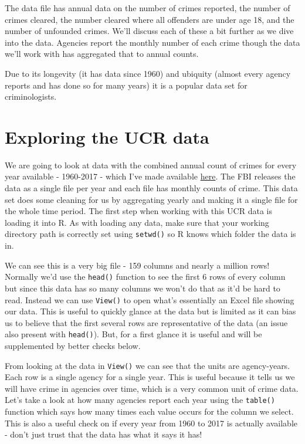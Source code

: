 \documentclass[
  12pt,
]{book}
\begin{document}
The data file has annual data on the number of crimes reported, the number of crimes cleared, the number cleared where all offenders are under age 18, and the number of unfounded crimes. We'll discuss each of these a bit further as we dive into the data. Agencies report the monthly number of each crime though the data we'll work with has aggregated that to annual counts.

Due to its longevity (it has data since 1960) and ubiquity (almost every agency reports and has done so for many years) it is a popular data set for criminologists.

\hypertarget{exploring-the-ucr-data}{%
\section{Exploring the UCR data}\label{exploring-the-ucr-data}}

We are going to look at data with the combined annual count of crimes for every year available - 1960-2017 - which I've made available \href{http://doi.org/10.3886/E100707V11}{here}. The FBI releases the data as a single file per year and each file has monthly counts of crime. This data set does some cleaning for us by aggregating yearly and making it a single file for the whole time period. The first step when working with this UCR data is loading it into R. As with loading any data, make sure that your working directory path is correctly set using \texttt{setwd()} so R knows which folder the data is in.

We can see this is a very big file - 159 columns and nearly a million rows! Normally we'd use the \texttt{head()} function to see the first 6 rows of every column but since this data has so many columns we won't do that as it'd be hard to read. Instead we can use \texttt{View()} to open what's essentially an Excel file showing our data. This is useful to quickly glance at the data but is limited as it can bias us to believe that the first several rows are representative of the data (an issue also present with \texttt{head()}). But, for a first glance it is useful and will be supplemented by better checks below.

From looking at the data in \texttt{View()} we can see that the units are agency-years. Each row is a single agency for a single year. This is useful because it tells us we will have crime in agencies over time, which is a very common unit of crime data. Let's take a look at how many agencies report each year using the \texttt{table()} function which says how many times each value occurs for the column we select. This is also a useful check on if every year from 1960 to 2017 is actually available - don't just trust that the data has what it says it has!
\end{document}
